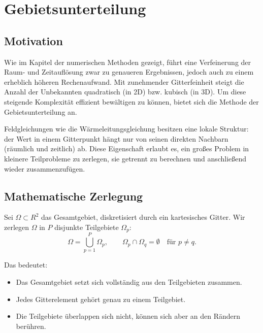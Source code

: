 %
%
\section{Gebietsunterteilung}
\label{parallelisierung:sec:Gebietsunterteilung}

\subsection{Motivation}
Wie im Kapitel der numerischen Methoden gezeigt, führt eine Verfeinerung der Raum- und Zeitauflösung zwar zu genaueren Ergebnissen, jedoch auch zu einem erheblich höheren Rechenaufwand. 
Mit zunehmender Gitterfeinheit steigt die Anzahl der Unbekannten quadratisch (in 2D) bzw. kubisch (in 3D).  
Um diese steigende Komplexität effizient bewältigen zu können, bietet sich die Methode der Gebietsunterteilung an.

Feldgleichungen wie die Wärmeleitungsgleichung besitzen eine lokale Struktur: 
der Wert in einem Gitterpunkt hängt nur von seinen direkten Nachbarn (räumlich und zeitlich) ab.  
Diese Eigenschaft erlaubt es, ein großes Problem in kleinere Teilprobleme zu zerlegen, sie getrennt zu berechnen und anschließend wieder zusammenzufügen.

\subsection{Mathematische Zerlegung}
Sei $\Omega \subset {R}^2$ das Gesamtgebiet, diskretisiert durch ein kartesisches Gitter.  
Wir zerlegen $\Omega$ in $P$ disjunkte Teilgebiete $\Omega_p$:
\begin{equation}
	\Omega = \bigcup_{p=1}^P \Omega_p,
	\qquad 
	\Omega_p \cap \Omega_q = \emptyset \quad \text{für } p \neq q.
\end{equation}

Das bedeutet:
\begin{itemize}
	\item Das Gesamtgebiet setzt sich vollständig aus den Teilgebieten zusammen.
	\item Jedes Gitterelement gehört genau zu einem Teilgebiet.
	\item Die Teilgebiete überlappen sich nicht, können sich aber an den Rändern berühren.
\end{itemize}

